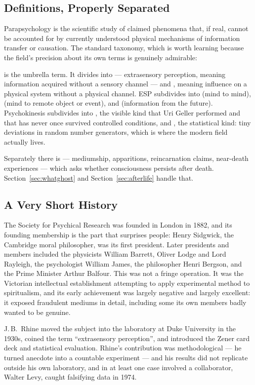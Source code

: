 \subsection{Definitions, Properly Separated}

Parapsychology is the scientific study of claimed phenomena that, if real, cannot be accounted for
by currently understood physical mechanisms of information transfer or causation. The standard
taxonomy, which is worth learning because the field's precision about its own terms is genuinely
admirable:

 is the umbrella term. It divides into  --- extrasensory perception, meaning
information acquired without a sensory channel --- and , meaning influence on a
physical system without a physical channel. ESP subdivides into  (mind to mind),
 (mind to remote object or event), and  (information from the
future). Psychokinesis subdivides into , the visible kind that Uri Geller performed
and that has never once survived controlled conditions, and , the statistical kind:
tiny deviations in random number generators, which is where the modern field actually lives.

Separately there is  --- mediumship, apparitions, reincarnation claims,
near-death experiences --- which asks whether consciousness persists after death. Section~\ref{sec:whatghost} and
Section~\ref{sec:afterlife} handle that.

\subsection{A Very Short History}

The Society for Psychical Research was founded in London in 1882, and its founding membership is
the part that surprises people: Henry Sidgwick, the Cambridge moral philosopher, was its first
president. Later presidents and members included the physicists William Barrett, Oliver Lodge and
Lord Rayleigh, the psychologist William James, the philosopher Henri Bergson, and the Prime
Minister Arthur Balfour. This was not a fringe operation. It was the Victorian intellectual
establishment attempting to apply experimental method to spiritualism, and its early achievement was
largely negative and largely excellent: it exposed fraudulent mediums in detail, including some its
own members badly wanted to be genuine.

J.\,B.\ Rhine moved the subject into the laboratory at Duke University in the 1930s, coined the term
``extrasensory perception'', and introduced the Zener card deck and statistical evaluation. Rhine's
contribution was methodological --- he turned anecdote into a countable experiment --- and his
results did not replicate outside his own laboratory, and in at least one case involved a
collaborator, Walter Levy, caught falsifying data in 1974.

